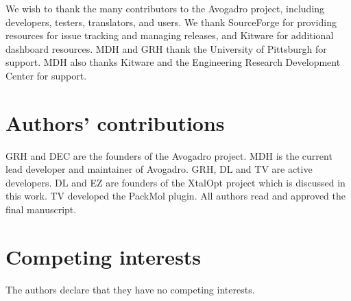\documentclass[10pt]{bmc_article}
\newenvironment{bmcformat}{\begin{raggedright}
\baselineskip20pt\sloppy\setboolean{publ}{false}}{\end{raggedright}
\baselineskip20pt\sloppy}
\begin{document}
\begin{bmcformat}
We wish to thank the many contributors to the Avogadro project, including
developers, testers, translators, and users. We thank SourceForge for
providing resources for issue tracking and managing releases, and
Kitware for additional dashboard resources. MDH and GRH thank the
University of Pittsburgh for support. MDH also thanks Kitware and the
Engineering Research Development Center for support.

\section{Authors' contributions}
GRH and DEC are the founders of the Avogadro project. MDH is the
current lead developer and maintainer of Avogadro. GRH, DL and TV are
active developers. DL and EZ are founders of the XtalOpt project which
is discussed in this work. TV developed the PackMol plugin. All
authors read and approved the final manuscript.

\section{Competing interests}

The authors declare that they have no competing interests.


\newpage
{
   }     %



\end{bmcformat}
\end{document}
